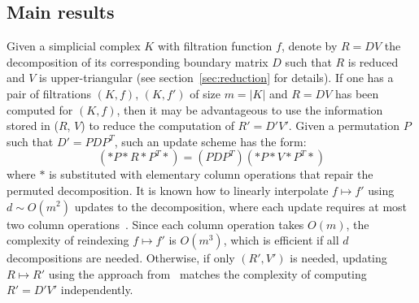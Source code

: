 \documentclass[sn-mathphys]{sn-jnl}
\begin{document}
\subsection{Main results}
Given a simplicial complex $K$ with filtration function $f$, denote by $R = D V$ the decomposition of its corresponding boundary matrix $D$ such that $R$ is reduced and $V$ is upper-triangular (see section~\ref{sec:reduction} for details).
 If one has a pair of filtrations $(K, f)$,  $(K, f')$ of size $m = \lvert K \rvert$ and $R = D V$ has been computed for $(K,f)$, then it may be advantageous to use the information stored in ($R$, $V$) to reduce the computation of $R' = D' V'$. 
Given a permutation $P$ such that $D' = P D P^T$, such an update scheme has the form: 
$$ (\ast P \ast R \ast P^T \ast) = (P DP^T)(\ast P \ast V \ast P^T \ast) $$
where $\ast$ is substituted with elementary column operations that repair the permuted decomposition. It is known how to linearly interpolate $f \mapsto f'$ using $d \sim O(m^2)$ updates to the decomposition, where each update  requires at most two column operations~\cite{cohen2006vines}. Since each column operation takes $O(m)$, the complexity of reindexing $f \mapsto f'$ is $O(m^3)$, which is efficient if all $d$ decompositions are needed. Otherwise, if only $(R', V')$ is needed, updating $R \mapsto R'$ using the approach from~\cite{cohen2006vines} matches the complexity of computing $R' = D' V'$ independently. 
\end{document}
